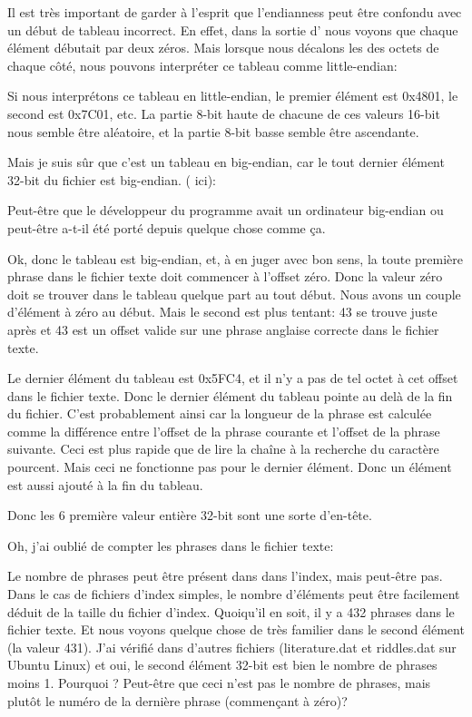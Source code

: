 Il est très important de garder à l'esprit que l'endianness peut être confondu avec
un début de tableau incorrect.
En effet, dans la sortie d' nous voyons que chaque élément débutait par deux
zéros.
Mais lorsque nous décalons les des octets de chaque côté, nous pouvons interpréter
ce tableau comme little-endian:



Si nous interprétons ce tableau en little-endian, le premier élément est 0x4801,
le second est 0x7C01, etc.
La partie 8-bit haute de chacune de ces valeurs 16-bit nous semble être aléatoire,
et la partie 8-bit basse semble être ascendante.

Mais je suis sûr que c'est un tableau en big-endian, car le tout dernier élément
32-bit du fichier est big-endian.
( ici):



Peut-être que le développeur du programme  avait un ordinateur big-endian
ou peut-être a-t-il été porté depuis quelque chose comme ça.

Ok, donc le tableau est big-endian, et, à en juger avec bon sens, la toute première
phrase dans le fichier texte doit commencer à l'offset zéro. Donc la valeur zéro
doit se trouver dans le tableau quelque part au tout début.
Nous avons un couple d'élément à zéro au début. Mais le second est plus tentant:
43 se trouve juste après et 43 est un offset valide sur une phrase anglaise correcte
dans le fichier texte.

Le dernier élément du tableau est 0x5FC4, et il n'y a pas de tel octet à cet offset
dans le fichier texte.
Donc le dernier élément du tableau pointe au delà de la fin du fichier.
C'est probablement ainsi car la longueur de la phrase est calculée comme la différence
entre l'offset de la phrase courante et l'offset de la phrase suivante.
Ceci est plus rapide que de lire la chaîne à la recherche du caractère pourcent.
Mais ceci ne fonctionne pas pour le dernier élément.
Donc un élément  est aussi ajouté à la fin du tableau.

Donc les 6 première valeur entière 32-bit sont une sorte d'en-tête.

Oh, j'ai oublié de compter les phrases dans le fichier texte:



Le nombre de phrases peut être présent dans dans l'index, mais peut-être pas.
Dans le cas de fichiers d'index simples, le nombre d'éléments peut être facilement
déduit de la taille du fichier d'index.
Quoiqu'il en soit, il y a 432 phrases dans le fichier texte.
Et nous voyons quelque chose de très familier dans le second élément (la valeur 431).
J'ai vérifié dans d'autres fichiers (literature.dat et riddles.dat sur Ubuntu Linux)
et oui, le second élément 32-bit est bien le nombre de phrases moins 1.
Pourquoi ? Peut-être que ceci n'est pas le nombre de phrases, mais plutôt
le numéro de la dernière phrase (commençant à zéro)?

